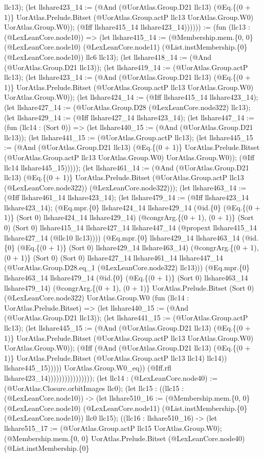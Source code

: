 \documentclass[11pt]{article}
\begin{document}
llc13); (let llshare423\_14 := (@And (@UorAtlas.Group.D21 llc13) (@Eq.\{(0 + 1)\} UorAtlas.Prelude.Bitset (@UorAtlas.Group.actP llc13 UorAtlas.Group.W0) UorAtlas.Group.W0)); (@Iff llshare415\_14 llshare423\_14)))))) := (fun (llc13 : (@LexLeanCore.node10)) => (let llshare415\_14 := (@Membership.mem.\{0, 0\} (@LexLeanCore.node10) (@LexLeanCore.node11) (@List.instMembership.\{0\} (@LexLeanCore.node10)) llc6 llc13); (let llshare418\_14 := (@And (@UorAtlas.Group.D21 llc13)); (let llshare419\_14 := (@UorAtlas.Group.actP llc13); (let llshare423\_14 := (@And (@UorAtlas.Group.D21 llc13) (@Eq.\{(0 + 1)\} UorAtlas.Prelude.Bitset (@UorAtlas.Group.actP llc13 UorAtlas.Group.W0) UorAtlas.Group.W0)); (let llshare424\_14 := (@Iff llshare415\_14 llshare423\_14); (let llshare427\_14 := (@UorAtlas.Group.D28 (@LexLeanCore.node322) llc13); (let llshare429\_14 := (@Iff llshare427\_14 llshare423\_14); (let llshare447\_14 := (fun (llc14 : (Sort 0)) => (let llshare440\_15 := (@And (@UorAtlas.Group.D21 llc13)); (let llshare441\_15 := (@UorAtlas.Group.actP llc13); (let llshare445\_15 := (@And (@UorAtlas.Group.D21 llc13) (@Eq.\{(0 + 1)\} UorAtlas.Prelude.Bitset (@UorAtlas.Group.actP llc13 UorAtlas.Group.W0) UorAtlas.Group.W0)); (@Iff llc14 llshare445\_15))))); (let llshare461\_14 := (@And (@UorAtlas.Group.D21 llc13) (@Eq.\{(0 + 1)\} UorAtlas.Prelude.Bitset (@UorAtlas.Group.actP llc13 (@LexLeanCore.node322)) (@LexLeanCore.node322))); (let llshare463\_14 := (@Iff llshare461\_14 llshare423\_14); (let llshare479\_14 := (@Iff llshare423\_14 llshare423\_14); (@Eq.mpr.\{0\} llshare424\_14 llshare429\_14 (@id.\{0\} (@Eq.\{(0 + 1)\} (Sort 0) llshare424\_14 llshare429\_14) (@congrArg.\{(0 + 1), (0 + 1)\} (Sort 0) (Sort 0) llshare415\_14 llshare427\_14 llshare447\_14 (@propext llshare415\_14 llshare427\_14 (@llc10 llc13)))) (@Eq.mpr.\{0\} llshare429\_14 llshare463\_14 (@id.\{0\} (@Eq.\{(0 + 1)\} (Sort 0) llshare429\_14 llshare463\_14) (@congrArg.\{(0 + 1), (0 + 1)\} (Sort 0) (Sort 0) llshare427\_14 llshare461\_14 llshare447\_14 (@UorAtlas.Group.D28.eq\_1 (@LexLeanCore.node322) llc13))) (@Eq.mpr.\{0\} llshare463\_14 llshare479\_14 (@id.\{0\} (@Eq.\{(0 + 1)\} (Sort 0) llshare463\_14 llshare479\_14) (@congrArg.\{(0 + 1), (0 + 1)\} UorAtlas.Prelude.Bitset (Sort 0) (@LexLeanCore.node322) UorAtlas.Group.W0 (fun (llc14 : UorAtlas.Prelude.Bitset) => (let llshare440\_15 := (@And (@UorAtlas.Group.D21 llc13)); (let llshare441\_15 := (@UorAtlas.Group.actP llc13); (let llshare445\_15 := (@And (@UorAtlas.Group.D21 llc13) (@Eq.\{(0 + 1)\} UorAtlas.Prelude.Bitset (@UorAtlas.Group.actP llc13 UorAtlas.Group.W0) UorAtlas.Group.W0)); (@Iff (@And (@UorAtlas.Group.D21 llc13) (@Eq.\{(0 + 1)\} UorAtlas.Prelude.Bitset (@UorAtlas.Group.actP llc13 llc14) llc14)) llshare445\_15))))) UorAtlas.Group.W0\_eq)) (@Iff.rfl llshare423\_14)))))))))))))))); (let llc14 : (@LexLeanCore.node40) := (@UorAtlas.Closure.orbitImages llc0); (let llc15 : ((llc15 : (@LexLeanCore.node10)) -> (let llshare510\_16 := (@Membership.mem.\{0, 0\} (@LexLeanCore.node10) (@LexLeanCore.node11) (@List.instMembership.\{0\} (@LexLeanCore.node10)) llc0 llc15); ((llc16 : llshare510\_16) -> (let llshare515\_17 := (@UorAtlas.Group.actP llc15 UorAtlas.Group.W0); (@Membership.mem.\{0, 0\} UorAtlas.Prelude.Bitset (@LexLeanCore.node40) (@List.instMembership.\{0\} 
\end{document}
